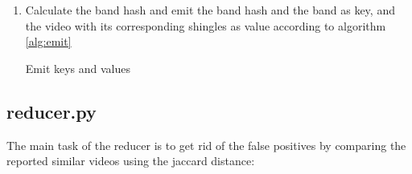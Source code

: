 \documentclass[a4paper, 11pt]{article}
\begin{document}
\begin{enumerate}
\begin{algorithm}
\begin{algorithmic}
\end{algorithmic} \end{algorithm}


\item Calculate the band hash and emit the band hash and the band as key, and
the video with its corresponding shingles as value according to algorithm
\autoref{alg:emit}

\begin{algorithm}
\caption{Emit keys and values}\label{alg:emit}
\begin{algorithmic} 





\ENDFOR

\end{algorithmic} \end{algorithm}


\end{enumerate}


\subsection*{reducer.py}

The main task of the reducer is to get rid of the false positives by comparing
the reported similar videos using the jaccard distance:
\end{document}
